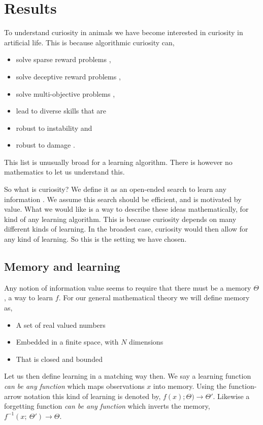 \section{Results} 
To understand curiosity in animals we have become interested in curiosity in artificial life. This is because algorithmic curiosity can,

\begin{itemize}
\item solve sparse reward problems \cite{needed},
\item solve deceptive reward problems \cite{needed},
\item solve multi-objective problems \cite{needed},
\item lead to diverse skills that are
\item robust to instability and \cite{needed} 
\item robust to damage \cite{needed}.
\end{itemize}

This list is unusually broad for a learning algorithm. There is however no mathematics to let us understand this. 

So what is curiosity? We define it as an open-ended search to learn any information \cite{Kidd2015}. We assume this search should be efficient, and is motivated by value. What we would like is a way to describe these ideas mathematically, for kind of any learning algorithm. This is because curiosity depends on many different kinds of learning. In the broadest case, curiosity would then allow for any kind of learning. So this is the setting we have chosen. 

\subsection{Memory and learning} 
Any notion of information value seems to require that there must be a memory $\Theta$, a way to learn $f$. For our general mathematical theory we will define memory as,

\begin{itemize}
\item A set of real valued numbers
\item Embedded in a finite space, with $N$ dimensions 
\item That is closed and bounded
\end{itemize}

Let us then define learning in a matching way then. We say a learning function \textit{can be any function} which maps observations $x$ into memory. Using the function-arrow notation this kind of learning is denoted by, $f(x);\Theta) \rightarrow \Theta'$. Likewise a forgetting function \textit{can be any function} which inverts the memory, $f^{-1}(x;\ \Theta') \rightarrow \Theta$. 

